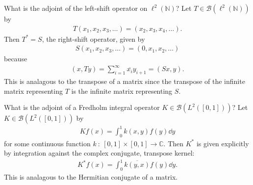 \documentclass[avery5388,grid,frame]{flashcards}
\newcommand{\f}[3]{#1\ :\ #2 \rightarrow #3}
\def\Cx{\mathbb{C}}
\begin{document}
\begin{flashcard}
    {What is the adjoint of the left-shift operator on $\ell^2(\mathbb{N})$?}
    Let $T \in \mathcal{B}(\ell^2(\mathbb{N}))$ by
    \begin{align*}
        T(x_1,x_2,x_3,\dots) = (x_2,x_3,x_4,\dots).
    \end{align*}
    Then $T^* = S$, the right-shift operator, given by
    \begin{align*}
        S(x_1,x_2,x_3,\dots) = (0, x_1, x_2,\dots)
    \end{align*}
    because
    \begin{align*}
        (x,Ty) = \sum_{i=1}^\infty \overline{x_i}y_{i+1} = (Sx, y).
    \end{align*}
    This is analagous to the transpose of a matrix since the transpose of the infinite matrix representing $T$ is the infinite matrix representing $S$.
\end{flashcard}

\begin{flashcard}
    {What is the adjoint of a Fredholm integral operator $K \in \mathcal{B}(L^2([0,1]))$?}
    Let $K \in \mathcal{B}(L^2([0,1]))$ by
    \begin{align*}
        Kf(x) = \int_0^1 k(x,y)f(y)\dd y
    \end{align*}
    for some continuous function $\f{k}{[0,1]\times[0,1]}{\Cx}$.  Then $K^*$ is given explicitly by integration against the complex conjugate, transpose kernel:
    \begin{align*}
        K^*f(x) = \int_0^1 \overline{k(y,x)}f(y)\dd y.
    \end{align*}
    This is analagous to the Hermitian conjugate of a matrix.
\end{flashcard}
\end{document}
